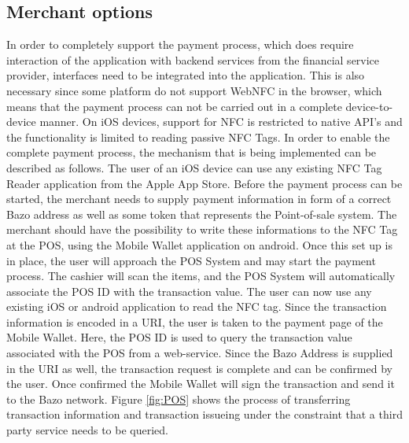 \subsection{Merchant options}\label{merchantoptions}
In order to completely support the payment process, which does require interaction of the application with backend services from the financial service provider, interfaces need to be integrated into the application.
This is also necessary since some platform do not support WebNFC in the browser, which means that the payment process can not be carried out in a complete device-to-device manner. On iOS devices, support for NFC is restricted to native API's and the functionality is limited to reading passive NFC Tags.
In order to enable the complete payment process, the mechanism that is being implemented can be described as follows. The user of an iOS device can use any existing NFC Tag Reader application from the Apple App Store. Before the payment process can be started, the merchant needs to supply payment information in form of a correct Bazo address as well as some token that represents the Point-of-sale system. The merchant should have the possibility to write these informations to the NFC Tag at the POS, using the Mobile Wallet application on android.
Once this set up is in place, the user will approach the POS System and may start the payment process. The cashier will scan the items, and the POS System will automatically associate the POS ID with the transaction value. The user can now use any existing iOS or android application to read the NFC tag. Since the transaction information is encoded in a URI, the user is taken to the payment page of the Mobile Wallet. Here, the POS ID is used to query the transaction value associated with the POS from a web-service. Since the Bazo Address is supplied in the URI as well, the transaction request is complete and can be confirmed by the user. Once confirmed the Mobile Wallet will sign the transaction and send it to the Bazo network. Figure
\ref{fig:POS} shows the process of transferring transaction information and transaction issueing under the constraint that a third party service needs to be queried.

